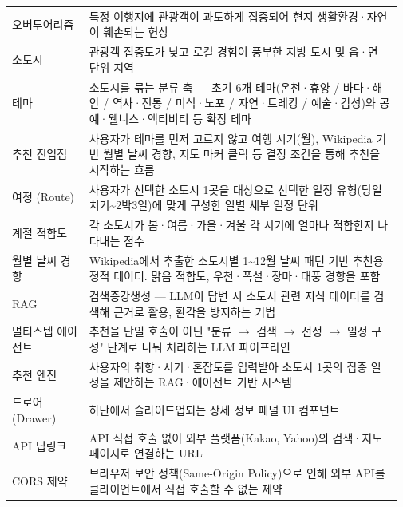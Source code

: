 \documentclass[12pt,a4paper]{article}
\newcommand{\DocNeedspace}[1]{\par\ifdim\dimexpr\pagegoal-\pagetotal\relax<#1\newpage\fi}
\renewcommand{\arraystretch}{1.35}
\begin{document}
\DocNeedspace{32\baselineskip}
\begin{small}
\setlength{\tabcolsep}{3pt}
\setlength{\extrarowheight}{1pt}
\renewcommand{\arraystretch}{1.42}
\begin{longtable}{@{}>{\RaggedRight\arraybackslash}m{0.199\linewidth}>{\RaggedRight\arraybackslash}m{0.773\linewidth}@{}}
\toprule
\multicolumn{1}{>{\centering\arraybackslash}m{0.199\linewidth}}{\textbf{용어}} & \multicolumn{1}{>{\centering\arraybackslash}m{0.773\linewidth}}{\textbf{정의}} \\
\midrule
\endhead
오버투어리즘 & 특정 여행지에 관광객이 과도하게 집중되어 현지 생활환경·자연이 훼손되는 현상 \\
소도시 & 관광객 집중도가 낮고 로컬 경험이 풍부한 지방 도시 및 읍·면 단위 지역 \\
테마 & 소도시를 묶는 분류 축 --- 초기 6개 테마(온천·휴양 / 바다·해안 / 역사·전통 / 미식·노포 / 자연·트레킹 / 예술·감성)와 공예·웰니스·액티비티 등 확장 테마 \\
추천 진입점 & 사용자가 테마를 먼저 고르지 않고 여행 시기(월), Wikipedia 기반 월별 날씨 경향, 지도 마커 클릭 등 결정 조건을 통해 추천을 시작하는 흐름 \\
여정 (Route) & 사용자가 선택한 소도시 1곳을 대상으로 선택한 일정 유형(당일치기\textasciitilde{}2박3일)에 맞게 구성한 일별 세부 일정 단위 \\
계절 적합도 & 각 소도시가 봄·여름·가을·겨울 각 시기에 얼마나 적합한지 나타내는 점수 \\
월별 날씨 경향 & Wikipedia에서 추출한 소도시별 1\textasciitilde{}12월 날씨 패턴 기반 추천용 정적 데이터. 맑음 적합도, 우천·폭설·장마·태풍 경향을 포함 \\
RAG & 검색증강생성 --- LLM이 답변 시 소도시 관련 지식 데이터를 검색해 근거로 활용, 환각을 방지하는 기법 \\
멀티스텝 에이전트 & 추천을 단일 호출이 아닌 "분류 $\rightarrow$ 검색 $\rightarrow$ 선정 $\rightarrow$ 일정 구성" 단계로 나눠 처리하는 LLM 파이프라인 \\
추천 엔진 & 사용자의 취향·시기·혼잡도를 입력받아 소도시 1곳의 집중 일정을 제안하는 RAG·에이전트 기반 시스템 \\
드로어 (Drawer) & 하단에서 슬라이드업되는 상세 정보 패널 UI 컴포넌트 \\
API 딥링크 & API 직접 호출 없이 외부 플랫폼(Kakao, Yahoo)의 검색·지도 페이지로 연결하는 URL \\
CORS 제약 & 브라우저 보안 정책(Same-Origin Policy)으로 인해 외부 API를 클라이언트에서 직접 호출할 수 없는 제약 \\
\bottomrule
\end{longtable}
\end{small}
\end{document}
